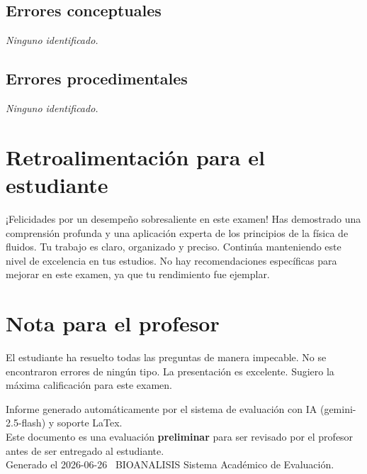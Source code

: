 \documentclass[11pt,a4paper]{article}
\begin{document}
\subsection*{Errores conceptuales}
\textit{Ninguno identificado.}

\subsection*{Errores procedimentales}
\textit{Ninguno identificado.}

\section*{Retroalimentación para el estudiante}
\begin{tcolorbox}[cajaRecomendacion, title={Dirigido a: michelle lopez 33483425}]
¡Felicidades por un desempeño sobresaliente en este examen! Has demostrado una comprensión profunda y una aplicación experta de los principios de la física de fluidos. Tu trabajo es claro, organizado y preciso. Continúa manteniendo este nivel de excelencia en tus estudios. No hay recomendaciones específicas para mejorar en este examen, ya que tu rendimiento fue ejemplar.
\end{tcolorbox}

\section*{Nota para el profesor}
\begin{tcolorbox}[
  enhanced, breakable,
  colback=yellow!8, colframe=yellow!60!black,
  fonttitle=\bfseries, coltitle=black,
  title={Observaciones para revisión manual},
  top=4pt, bottom=4pt, left=8pt, right=8pt,
]
El estudiante ha resuelto todas las preguntas de manera impecable. No se encontraron errores de ningún tipo. La presentación es excelente. Sugiero la máxima calificación para este examen.
\end{tcolorbox}

\vspace{12pt}
\begin{center}
  \footnotesize\color{gray}
  Informe generado automáticamente por el sistema de evaluación con IA (gemini-2.5-flash) y soporte LaTex. \\
  Este documento es una evaluación \textbf{preliminar} para ser revisado por el profesor antes de ser entregado al 
  estudiante. \\
  Generado el 2026-06-26 \textbullet\ BIOANALISIS Sistema Académico de Evaluación.
  \end{center}
\end{document}
